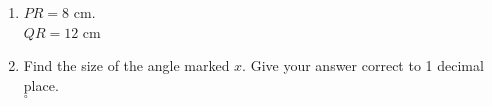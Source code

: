 \begin{enumerate}
\begin{enumerate}
\begin{figure}[H]
    \end{figure}
    \item[]\mbox{}
      $PR = 8$ cm.\\
      $QR = 12$ cm
      \newpage
    \item Find the size of the angle marked $x$. Give your answer correct to 1 decimal place.\\[3.5cm]\vspace*{0pt}\hfill\dline $^\circ$
  \end{enumerate}
  





\end{enumerate}